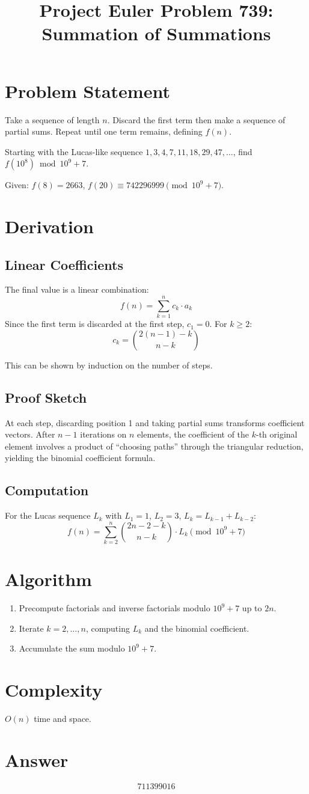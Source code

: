 \documentclass[12pt]{article}
\title{Project Euler Problem 739: Summation of Summations}
\author{}
\date{}
\begin{document}
\maketitle

\section{Problem Statement}
Take a sequence of length $n$. Discard the first term then make a sequence of partial sums. Repeat until one term remains, defining $f(n)$.

Starting with the Lucas-like sequence $1,3,4,7,11,18,29,47,\ldots$, find $f(10^8)\bmod 10^9+7$.

Given: $f(8)=2663$, $f(20)\equiv 742296999\pmod{10^9+7}$.

\section{Derivation}

\subsection{Linear Coefficients}
The final value is a linear combination:
\[
f(n) = \sum_{k=1}^{n} c_k \cdot a_k
\]
Since the first term is discarded at the first step, $c_1=0$. For $k\ge 2$:
\[
c_k = \binom{2(n-1)-k}{n-k}
\]

This can be shown by induction on the number of steps.

\subsection{Proof Sketch}
At each step, discarding position 1 and taking partial sums transforms coefficient vectors. After $n-1$ iterations on $n$ elements, the coefficient of the $k$-th original element involves a product of ``choosing paths'' through the triangular reduction, yielding the binomial coefficient formula.

\subsection{Computation}
For the Lucas sequence $L_k$ with $L_1=1$, $L_2=3$, $L_k=L_{k-1}+L_{k-2}$:
\[
f(n) = \sum_{k=2}^{n}\binom{2n-2-k}{n-k}\cdot L_k \pmod{10^9+7}
\]

\section{Algorithm}
\begin{enumerate}
\item Precompute factorials and inverse factorials modulo $10^9+7$ up to $2n$.
\item Iterate $k=2,\ldots,n$, computing $L_k$ and the binomial coefficient.
\item Accumulate the sum modulo $10^9+7$.
\end{enumerate}

\section{Complexity}
$O(n)$ time and space.

\section{Answer}

\[
\boxed{711399016}
\]
\end{document}
